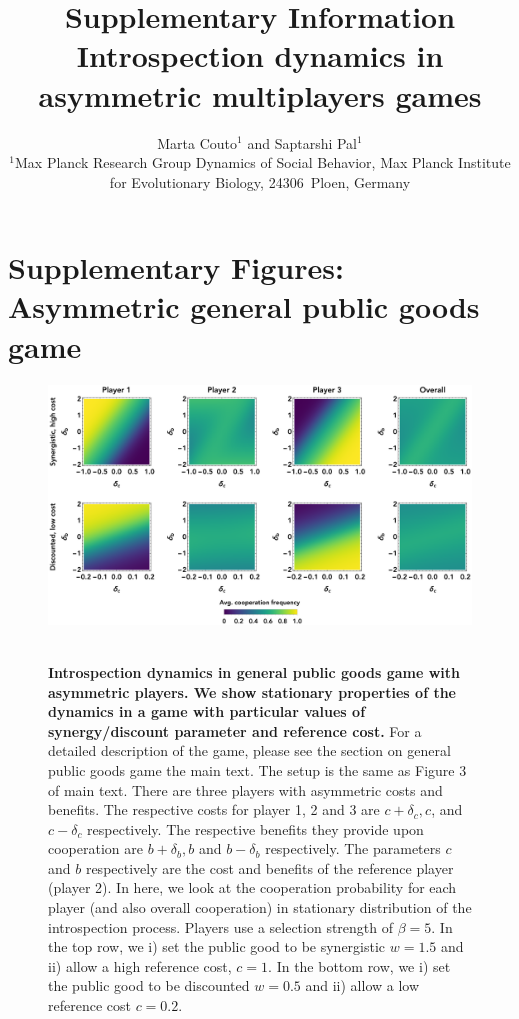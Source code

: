 \documentclass[11pt]{article}
\title{\vspace{200pt} \sffamily \Large Supplementary Information\\[0.1cm] {\bfseries Introspection dynamics in asymmetric multiplayers games}}
\date{\empty}
\author{\parbox[c]{16cm}{\centering \onehalfspacing \fontsize{11}{12}\selectfont Marta Couto$^1$ and Saptarshi Pal$^1$\\[0.2cm]
$^1$Max Planck Research Group Dynamics of Social Behavior, Max Planck Institute for Evolutionary Biology, 24306~Ploen, Germany}}
\theoremstyle{plainCl1}
\theoremstyle{plainCl2}
\begin{document}
\maketitle
\onehalfspacing
\newpage
\section*{Supplementary Figures: Asymmetric general public goods game}



\begin{figure}[h!]
\centering
\includegraphics[width =  \textwidth]{figures/Supfigure1.eps}~\\[0.4cm]
\caption{\onehalfspacing
\textbf{Introspection dynamics in general public goods game with asymmetric players. We show stationary properties of the dynamics in a game with particular values of synergy/discount parameter and reference cost.} For a detailed description of the game, please see the section on general public goods game the main text. The setup is the same as Figure 3 of main text. There are three players with asymmetric costs and benefits. The respective costs for player 1, 2 and 3 are $c + \delta_c, c$, and $c - \delta_c$ respectively. The respective benefits they provide upon cooperation are $b + \delta_b, b$ and $b - \delta_b$ respectively. The parameters $c$ and $b$ respectively are the cost and benefits of the reference player (player 2). In here, we look at the cooperation probability for each player (and also overall cooperation) in stationary distribution of the introspection process. Players use a selection strength of $\beta = 5$. In the top row, we i) set the public good to be synergistic $w = 1.5$ and ii) allow a high reference cost, $c = 1$. In the bottom row, we i) set the public good to be discounted $w = 0.5$ and ii) allow a low reference cost $c = 0.2$. }
 
\label{Fig:Supp-Fig1}
\end{figure}
\clearpage
\end{document}
